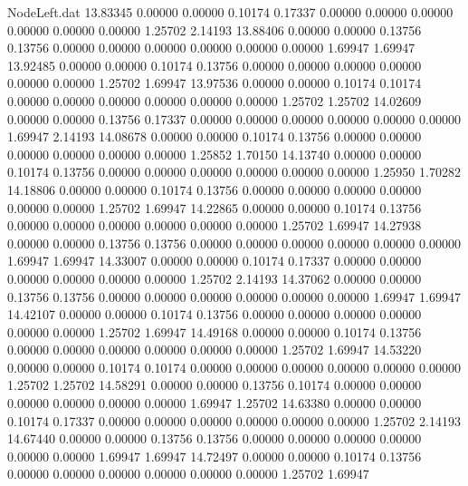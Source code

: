 \begin{filecontents}{NodeLeft.dat}
  13.83345    0.00000    0.00000     0.10174    0.17337    0.00000    0.00000    0.00000    0.00000    0.00000    0.00000    1.25702    2.14193
  13.88406    0.00000    0.00000     0.13756    0.13756    0.00000    0.00000    0.00000    0.00000    0.00000    0.00000    1.69947    1.69947
  13.92485    0.00000    0.00000     0.10174    0.13756    0.00000    0.00000    0.00000    0.00000    0.00000    0.00000    1.25702    1.69947
  13.97536    0.00000    0.00000     0.10174    0.10174    0.00000    0.00000    0.00000    0.00000    0.00000    0.00000    1.25702    1.25702
  14.02609    0.00000    0.00000     0.13756    0.17337    0.00000    0.00000    0.00000    0.00000    0.00000    0.00000    1.69947    2.14193
  14.08678    0.00000    0.00000     0.10174    0.13756    0.00000    0.00000    0.00000    0.00000    0.00000    0.00000    1.25852    1.70150
  14.13740    0.00000    0.00000     0.10174    0.13756    0.00000    0.00000    0.00000    0.00000    0.00000    0.00000    1.25950    1.70282
  14.18806    0.00000    0.00000     0.10174    0.13756    0.00000    0.00000    0.00000    0.00000    0.00000    0.00000    1.25702    1.69947
  14.22865    0.00000    0.00000     0.10174    0.13756    0.00000    0.00000    0.00000    0.00000    0.00000    0.00000    1.25702    1.69947
  14.27938    0.00000    0.00000     0.13756    0.13756    0.00000    0.00000    0.00000    0.00000    0.00000    0.00000    1.69947    1.69947
  14.33007    0.00000    0.00000     0.10174    0.17337    0.00000    0.00000    0.00000    0.00000    0.00000    0.00000    1.25702    2.14193
  14.37062    0.00000    0.00000     0.13756    0.13756    0.00000    0.00000    0.00000    0.00000    0.00000    0.00000    1.69947    1.69947
  14.42107    0.00000    0.00000     0.10174    0.13756    0.00000    0.00000    0.00000    0.00000    0.00000    0.00000    1.25702    1.69947
  14.49168    0.00000    0.00000     0.10174    0.13756    0.00000    0.00000    0.00000    0.00000    0.00000    0.00000    1.25702    1.69947
  14.53220    0.00000    0.00000     0.10174    0.10174    0.00000    0.00000    0.00000    0.00000    0.00000    0.00000    1.25702    1.25702
  14.58291    0.00000    0.00000     0.13756    0.10174    0.00000    0.00000    0.00000    0.00000    0.00000    0.00000    1.69947    1.25702
  14.63380    0.00000    0.00000     0.10174    0.17337    0.00000    0.00000    0.00000    0.00000    0.00000    0.00000    1.25702    2.14193
  14.67440    0.00000    0.00000     0.13756    0.13756    0.00000    0.00000    0.00000    0.00000    0.00000    0.00000    1.69947    1.69947
  14.72497    0.00000    0.00000     0.10174    0.13756    0.00000    0.00000    0.00000    0.00000    0.00000    0.00000    1.25702    1.69947

\end{filecontents}
